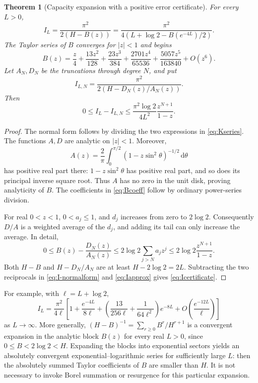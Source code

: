 \documentclass[11pt,a4paper]{article}
\newtheorem{theorem}{Theorem}[section]
\theoremstyle{definition}
\theoremstyle{remark}
\newcommand{\dd}{\,\mathrm d}
\begin{document}
\begin{theorem}[Capacity expansion with a positive error certificate]
\label{thm:capacity-series}
For every $L>0$,
\begin{equation}
 I_L=\frac{\pi^2}{2(H-B(z))}
 =\frac{\pi^2}{4(L+\log2-B(e^{-4L})/2)}.
 \label{eq:I-normalform}
\end{equation}
The Taylor series of $B$ converges for $|z|<1$ and begins
\begin{equation}
 B(z)=\frac z4+\frac{13z^2}{128}+\frac{23z^3}{384}
 +\frac{2701z^4}{65536}+\frac{5057z^5}{163840}+O(z^6).
 \label{eq:Bcoeff}
\end{equation}
Let $A_N,D_N$ be the truncations through degree $N$, and put
\begin{equation}
 I_{L,N}=\frac{\pi^2}{2(H-D_N(z)/A_N(z))}.
 \label{eq:Iapprox}
\end{equation}
Then
\begin{equation}
 0\le I_L-I_{L,N}
 \le\frac{\pi^2\log2}{4L^2}\frac{z^{N+1}}{1-z}.
 \label{eq:Icertificate}
\end{equation}
\end{theorem}
\begin{proof}
The normal form follows by dividing the two expressions in
\eqref{eq:Kseries}. The functions $A,D$ are analytic on $|z|<1$.
Moreover,
\[
 A(z)=\frac2\pi\int_0^{\pi/2}(1-z\sin^2\theta)^{-1/2}\dd\theta
\]
has positive real part there: $1-z\sin^2\theta$ has positive real part,
and so does its principal inverse square root. Thus $A$ has no zero in
the unit disk, proving analyticity of $B$. The coefficients in
\eqref{eq:Bcoeff} follow by ordinary power-series division.

For real $0<z<1$, $0<a_j\le1$, and $d_j$ increases from zero to $2\log2$.
Consequently $D/A$ is a weighted average of the $d_j$, and adding its tail
can only increase the average. In detail,
\[
 0\le B(z)-\frac{D_N(z)}{A_N(z)}
 \le 2\log2\sum_{j>N}a_jz^j
 \le 2\log2\frac{z^{N+1}}{1-z}.
\]
Both $H-B$ and $H-D_N/A_N$ are at least $H-2\log2=2L$.
Subtracting the two reciprocals in \eqref{eq:I-normalform} and
\eqref{eq:Iapprox} gives \eqref{eq:Icertificate}.
\end{proof}

For example, with $\ell=L+\log2$,
\begin{equation}
 I_L=\frac{\pi^2}{4\ell}
 \left[1+\frac{e^{-4L}}{8\ell}
 +\left(\frac{13}{256\ell}+\frac1{64\ell^2}\right)e^{-8L}
 +O\!\left(\frac{e^{-12L}}\ell\right)\right]
 \label{eq:I-firstsectors}
\end{equation}
as $L\to\infty$. More generally, $(H-B)^{-1}=\sum_{r\ge0}B^r/H^{r+1}$ is a convergent
expansion in the analytic block $B(z)$ for every real $L>0$, since
$0\le B<2\log2<H$. Expanding the blocks into exponential sectors yields
an absolutely convergent exponential--logarithmic series for sufficiently
large $L$: then the absolutely summed Taylor coefficients of $B$ are
smaller than $H$.
It is not necessary to invoke Borel summation or resurgence for this
particular expansion.
\end{document}
